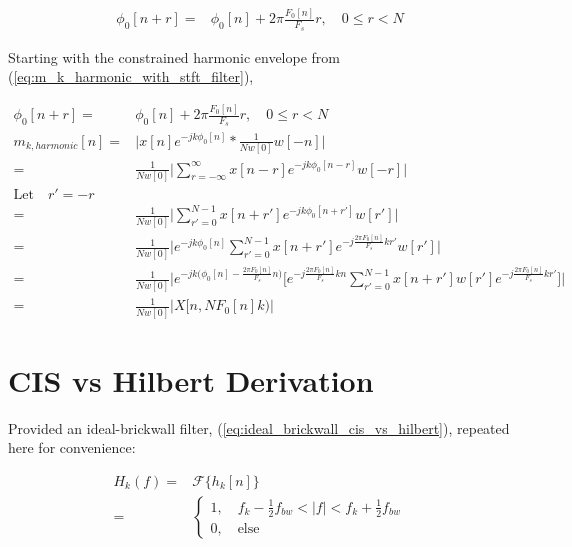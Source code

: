 \documentclass [11pt, proquest,oneside] {ganter_thesis}[2015/03/03]
\begin{document}
\begin{align}
\phi_0[n + r] =& \phi_0[n] + 2\pi \frac{F_0[n]}{F_s}r, \quad 0 \leq r < N
\end{align}

Starting with the constrained harmonic envelope from (\ref{eq:m_k_harmonic_with_stft_filter}), 

\begin{align}
\phi_0[n + r] =& \phi_0[n] + 2\pi \frac{F_0[n]}{F_s}r, \quad 0 \leq r < N \\
m_{k,harmonic}[n] =& \Bigg| x[n] e^{-jk\phi_0 [n]} *  \frac{1}{Nw[0]} w[-n] \Bigg| \nonumber \\
=& \frac{1}{Nw[0]} \Bigg| \sum_{r = -\infty}^\infty x[n - r] e^{-jk\phi_0 [n-r]} w[-r] \Bigg| \nonumber \\
\textrm{Let} \quad r' = -r \nonumber \\
=& \frac{1}{Nw[0]} \Bigg| \sum_{r' = 0}^{N-1} x[n + r'] e^{-jk\phi_0 [n + r']} w[r'] \Bigg|  \nonumber \\
=& \frac{1}{Nw[0]} \Bigg| e^{-jk \phi_0[n]} \sum_{r' = 0}^{N-1} x[n + r'] e^{-j \frac{2\pi F_0[n]}{F_s}kr'} w[r'] \Bigg| \nonumber \\
=& \frac{1}{Nw[0]} \Bigg| e^{-jk \Big(\phi_0[n] - \frac{2\pi F_0[n]}{F_s}n \Big)} \Bigg[ e^{-j \frac{2\pi F_0[n]}{F_s}kn} \sum_{r' = 0}^{N-1} x[n + r'] w[r'] e^{-j \frac{2\pi F_0[n]}{F_s}kr'} \Bigg] \Bigg| \nonumber \\
=& \frac{1}{Nw[0]} \Bigg| X\Big[n, N F_0[n] k \Big) \Bigg| \nonumber
\end{align}

\section{CIS vs Hilbert Derivation}\label{section:cis_vs_hilbert_derivation}

Provided an ideal-brickwall filter, (\ref{eq:ideal_brickwall_cis_vs_hilbert}), repeated here for convenience:

\begin{align}
H_k(f) =& \mathcal{F}\Big\{ h_k[n]  \Big\} \nonumber \\
=& \left\{
                \begin{array}{ll}
                1, \quad f_k - \frac{1}{2} f_{bw} < |f| < f_k + \frac{1}{2} f_{bw} \\
                0, \quad \mathrm{else}
                \end{array}
              \right. 
              \nonumber
\end{align}
\end{document}
